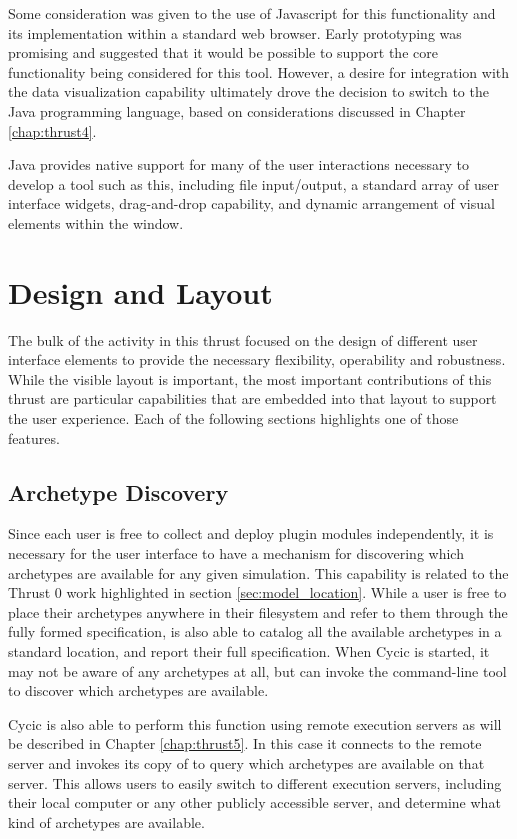 Some consideration was given to the use of Javascript for this functionality
and its implementation within a standard web browser.  Early prototyping was
promising and suggested that it would be possible to support the core
functionality being considered for this tool.  However, a desire for
integration with the data visualization capability ultimately drove the
decision to switch to the Java programming language, based on considerations
discussed in Chapter \ref{chap:thrust4}.

Java provides native support for many of the user interactions necessary to
develop a tool such as this, including file input/output, a standard array of
user interface widgets, drag-and-drop capability, and dynamic arrangement of
visual elements within the window.

\section{Design and Layout}

The bulk of the activity in this thrust focused on the design of different
user interface elements to provide the necessary flexibility, operability and
robustness.  While the visible layout is important, the most important
contributions of this thrust are particular capabilities that are embedded
into that layout to support the user experience.  Each of the following
sections highlights one of those features.

\subsection{Archetype Discovery}

Since each user is free to collect and deploy plugin modules independently, it
is necessary for the user interface to have a mechanism for discovering which
archetypes are available for any given simulation.  This capability is related
to the Thrust 0 work highlighted in section \ref{sec:model_location}.  While a
user is free to place their archetypes anywhere in their filesystem and refer
to them through the fully formed specification, \Cyclus is also able to
catalog all the available archetypes in a standard location, and report their
full specification.  When Cycic is started, it may not be aware of any
archetypes at all, but can invoke the \Cyclus command-line tool to discover
which archetypes are available.

Cycic is also able to perform this function using remote execution servers as
will be described in Chapter \ref{chap:thrust5}.  In this case it connects to
the remote server and invokes its copy of \Cyclus to query which archetypes
are available on that server.  This allows users to easily switch to different
execution servers, including their local computer or any other publicly
accessible server, and determine what kind of archetypes are available.

